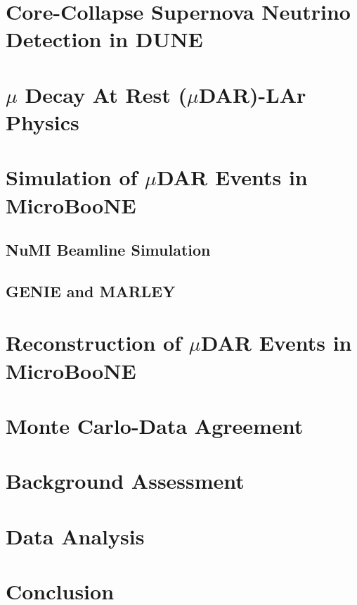 \section{Core-Collapse Supernova Neutrino Detection in DUNE}
\section{$\mu$ Decay At Rest ($\mu$DAR)-LAr Physics}
\section{Simulation of $\mu$DAR Events in MicroBooNE}
\subsection{NuMI Beamline Simulation}
\subsection{GENIE and MARLEY}
\section{Reconstruction of $\mu$DAR Events in MicroBooNE}
\section{Monte Carlo-Data Agreement}
\section{Background Assessment}
\section{Data Analysis}
\section{Conclusion}